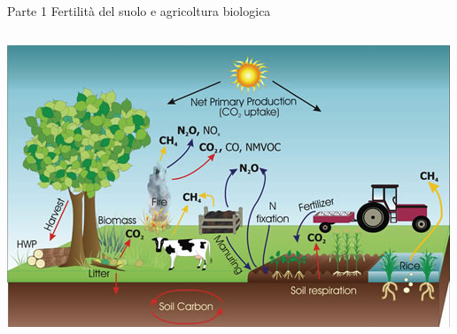 \documentclass[xcolor={usenames, table, x11names}, final, 10pt]{beamer}
\begin{document}
\begin{frame}{Parte 1 \small{Fertilità del suolo e agricoltura biologica}}
\begin{columns}
{      \centering
      \includegraphics[width=\textwidth]{../foto/carbonCycle.jpg}
    }
  \end{columns}
\end{frame}
\end{document}
